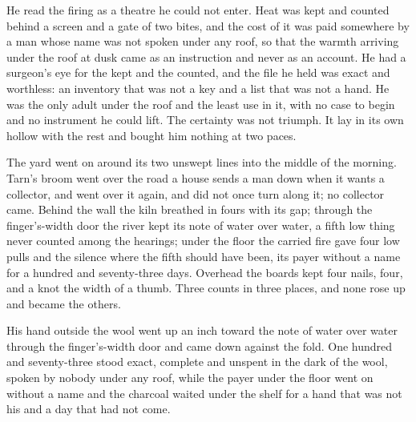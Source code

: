 He read the firing as a theatre he could not enter. Heat was kept and counted behind a screen and a gate of two bites, and the cost of it was paid somewhere by a man whose name was not spoken under any roof, so that the warmth arriving under the roof at dusk came as an instruction and never as an account. He had a surgeon's eye for the kept and the counted, and the file he held was exact and worthless: an inventory that was not a key and a list that was not a hand. He was the only adult under the roof and the least use in it, with no case to begin and no instrument he could lift. The certainty was not triumph. It lay in its own hollow with the rest and bought him nothing at two paces.

The yard went on around its two unswept lines into the middle of the morning. Tarn's broom went over the road a house sends a man down when it wants a collector, and went over it again, and did not once turn along it; no collector came. Behind the wall the kiln breathed in fours with its gap; through the finger's-width door the river kept its note of water over water, a fifth low thing never counted among the hearings; under the floor the carried fire gave four low pulls and the silence where the fifth should have been, its payer without a name for a hundred and seventy-three days. Overhead the boards kept four nails, four, and a knot the width of a thumb. Three counts in three places, and none rose up and became the others.

His hand outside the wool went up an inch toward the note of water over water through the finger's-width door and came down against the fold. One hundred and seventy-three stood exact, complete and unspent in the dark of the wool, spoken by nobody under any roof, while the payer under the floor went on without a name and the charcoal waited under the shelf for a hand that was not his and a day that had not come.
